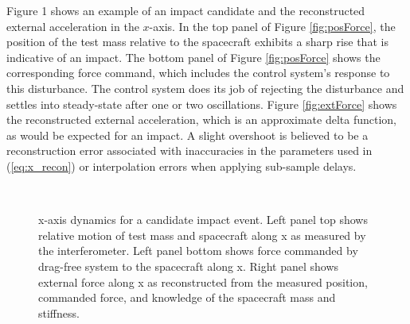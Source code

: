 \documentclass[a4paper]{jpconf}
\begin{document}
Figure 1 shows an example of an impact candidate and the reconstructed external acceleration in the $x$-axis. In the top panel of Figure \ref{fig:posForce}, the position of the test mass relative to the spacecraft exhibits a sharp rise that is indicative of an impact. The bottom panel of Figure \ref{fig:posForce} shows the corresponding force command, which includes the control system's response to this disturbance. The control system does its job of rejecting the disturbance and settles into steady-state after one or two oscillations. Figure \ref{fig:extForce} shows the reconstructed external acceleration, which is an approximate delta function, as would be expected for an impact. A slight overshoot is believed to be a reconstruction error associated with inaccuracies in the parameters used in (\ref{eq:x_recon}) or interpolation errors when applying sub-sample delays. 

\begin{figure}[h!]
	\centering
	\quad
	\\	
	\caption{x-axis dynamics for a candidate impact event. Left panel top shows relative motion of test mass and spacecraft along x as measured by the interferometer. Left panel bottom shows force commanded by drag-free system to the spacecraft along x. Right panel shows external force along x as reconstructed from the measured position, commanded force, and knowledge of the spacecraft mass and stiffness.}
\end{figure}
\end{document}
